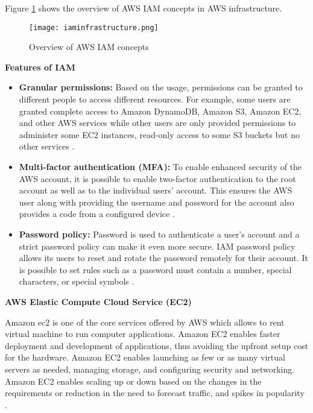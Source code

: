 Figure \ref{fig:iamidentities} shows the overview of AWS IAM concepts in AWS infrastructure.


\begin{figure}
    \centering
    \texttt{[image: iaminfrastructure.png]}
    \caption{Overview of AWS IAM concepts}{\cite{28}}
    \label{fig:iamidentities}
\end{figure}


\hfill \break

\textbf{Features of IAM}

\begin{itemize}
    \item \textbf{Granular permissions:} Based on the usage, permissions can be granted to different people to access
    different resources. For example, some users are
    granted complete access to Amazon DynamoDB, Amazon S3, Amazon EC2, and other AWS services while other users are only
    provided permissions to administer some EC2
    instances, read-only access to some S3 buckets but no other services \cite{27}.
\end{itemize}
\begin{itemize}
    \item \textbf{Multi-factor authentication (MFA):} To enable enhanced security of the AWS account, it is possible
    to enable
    two-factor authentication to the root account as well as to the individual users’ account. This ensures the AWS user along with providing the username and password for the account also provides a code from a configured device \cite{27}.
\end{itemize}
\begin{itemize}
    \item \textbf{Password policy:} Password is used to authenticate a user’s account and a strict password policy
    can make it
    even more secure.
    IAM password policy allows its users to reset and
    rotate the password remotely for their account.
    It is
    possible to set rules such as a password must contain a number, special characters, or special symbols \cite{27}.
\end{itemize}


\textbf{AWS Elastic Compute Cloud Service (EC2)}

\par Amazon \gls{ec2} is one of the core services offered by
AWS
which
allows to rent virtual machine to run computer
applications.
Amazon EC2 enables faster deployment and development of applications, thus avoiding the upfront setup cost for the hardware.
Amazon EC2 enables launching as few or as many virtual servers as needed, managing storage, and configuring security and networking.
Amazon EC2 enables scaling up or down based on the
changes in the requirements or reduction in the need to forecast traffic, and spikes in popularity \cite{29}.


